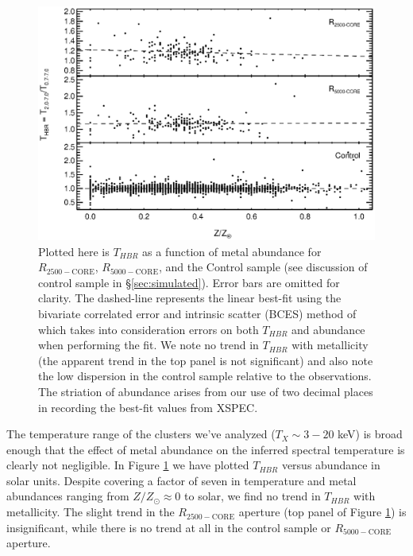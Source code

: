 \documentclass[12pt,preprint]{aastex}
\begin{document}
\clearpage
\begin{figure}
\begin{center}
\includegraphics*[width=\textwidth, trim=0mm 0mm 0mm 0mm, clip]{f6.eps}
\caption{
Plotted here is $T_{HBR}$ as a function of metal abundance for 
$R_{2500-\mathrm{CORE}}$, $R_{5000-\mathrm{CORE}}$, and the Control
sample (see discussion of control sample in
\S\ref{sec:simulated}). Error bars are omitted for clarity. The
dashed-line represents the linear best-fit using the bivariate
correlated error and intrinsic scatter (BCES) method of
\cite{1996ApJ...470..706A} which takes into consideration errors on
both $T_{HBR}$ and abundance when performing the fit. We note no trend
in $T_{HBR}$ with metallicity (the apparent trend in the top panel is
not significant) and also note the low dispersion in the control
sample relative to the observations. The striation of abundance arises
from our use of two decimal places in recording the best-fit values
from {\textsc{XSPEC}}.
}
\label{fig:metal}
\end{center}
\end{figure}
\clearpage

The temperature range of the clusters we've analyzed ($T_X \sim 3-20$
keV) is broad enough that the effect of metal abundance on the
inferred spectral temperature is clearly not negligible. In Figure
\ref{fig:metal} we have plotted $T_{HBR}$ versus abundance in solar
units. Despite covering a factor of seven in temperature and
metal abundances ranging from $Z/Z_{\odot} \approx 0$ to solar, we
find no trend in $T_{HBR}$ with metallicity. The slight trend in the
$R_{2500-\mathrm{CORE}}$ aperture (top panel of Figure
\ref{fig:metal}) is insignificant, while there is no trend at all in
the control sample or $R_{5000-\mathrm{CORE}}$ aperture.
\end{document}
